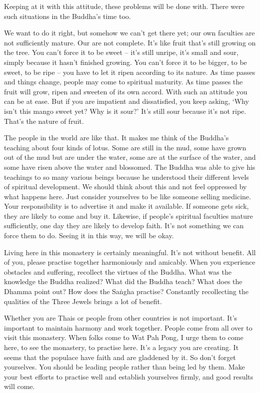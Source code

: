 Keeping at it with this attitude, these problems will be done with. There were such situations in the Buddha's time too. 

We want to do it right, but somehow we can't get there yet; our own faculties are not sufficiently mature. Our  are not complete. It's like fruit that's still growing on the tree. You can't force it to be sweet -- it's still unripe, it's small and sour, simply because it hasn't finished growing. You can't force it to be bigger, to be sweet, to be ripe -- you have to let it ripen according to its nature. As time passes and things change, people may come to spiritual maturity. As time passes the fruit will grow, ripen and sweeten of its own accord. With such an attitude you can be at ease. But if you are impatient and dissatisfied, you keep asking, `Why isn't this mango sweet yet? Why is it sour?' It's still sour because it's not ripe. That's the nature of fruit. 

The people in the world are like that. It makes me think of the Buddha's teaching about four kinds of lotus. Some are still in the mud, some have grown out of the mud but are under the water, some are at the surface of the water, and some have risen above the water and blossomed. The Buddha was able to give his teachings to so many various beings because he understood their different levels of spiritual development. We should think about this and not feel oppressed by what happens here. Just consider yourselves to be like someone selling medicine. Your responsibility is to advertise it and make it available. If someone gets sick, they are likely to come and buy it. Likewise, if people's spiritual faculties mature sufficiently, one day they are likely to develop faith. It's not something we can force them to do. Seeing it in this way, we will be okay. 

Living here in this monastery is certainly meaningful. It's not without benefit. All of you, please practise together harmoniously and amicably. When you experience obstacles and suffering, recollect the virtues of the Buddha. What was the knowledge the Buddha realized? What did the Buddha teach? What does the Dhamma point out? How does the Sa\.ngha practise? Constantly recollecting the qualities of the Three Jewels brings a lot of benefit. 

Whether you are Thais or people from other countries is not important. It's important to maintain harmony and work together. People come from all over to visit this monastery. When folks come to Wat Pah Pong, I urge them to come here, to see the monastery, to practise here. It's a legacy you are creating. It seems that the populace have faith and are gladdened by it. So don't forget yourselves. You should be leading people rather than being led by them. Make your best efforts to practise well and establish yourselves firmly, and good results will come. 

